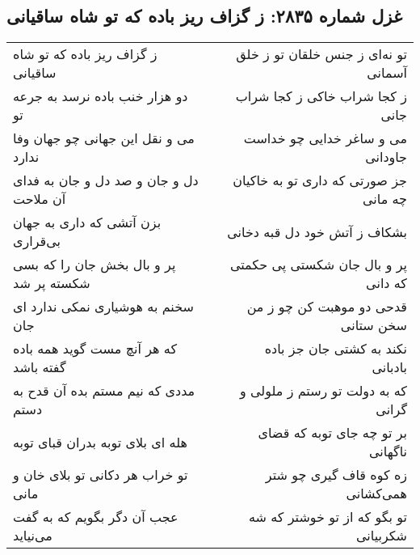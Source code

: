 \begin{center}
\section*{غزل شماره ۲۸۳۵: ز گزاف ریز باده که تو شاه ساقیانی}
\label{sec:2835}
\begin{longtable}{l p{0.5cm} r}
ز گزاف ریز باده که تو شاه ساقیانی
&&
تو نه‌ای ز جنس خلقان تو ز خلق آسمانی
\\
دو هزار خنب باده نرسد به جرعه تو
&&
ز کجا شراب خاکی ز کجا شراب جانی
\\
می و نقل این جهانی چو جهان وفا ندارد
&&
می و ساغر خدایی چو خداست جاودانی
\\
دل و جان و صد دل و جان به فدای آن ملاحت
&&
جز صورتی که داری تو به خاکیان چه مانی
\\
بزن آتشی که داری به جهان بی‌قراری
&&
بشکاف ز آتش خود دل قبه دخانی
\\
پر و بال بخش جان را که بسی شکسته پر شد
&&
پر و بال جان شکستی پی حکمتی که دانی
\\
سخنم به هوشیاری نمکی ندارد ای جان
&&
قدحی دو موهبت کن چو ز من سخن ستانی
\\
که هر آنچ مست گوید همه باده گفته باشد
&&
نکند به کشتی جان جز باده بادبانی
\\
مددی که نیم مستم بده آن قدح به دستم
&&
که به دولت تو رستم ز ملولی و گرانی
\\
هله ای بلای توبه بدران قبای توبه
&&
بر تو چه جای توبه که قضای ناگهانی
\\
تو خراب هر دکانی تو بلای خان و مانی
&&
زه کوه قاف گیری چو شتر همی‌کشانی
\\
عجب آن دگر بگویم که به گفت می‌نیاید
&&
تو بگو که از تو خوشتر که شه شکربیانی
\\
\end{longtable}
\end{center}
